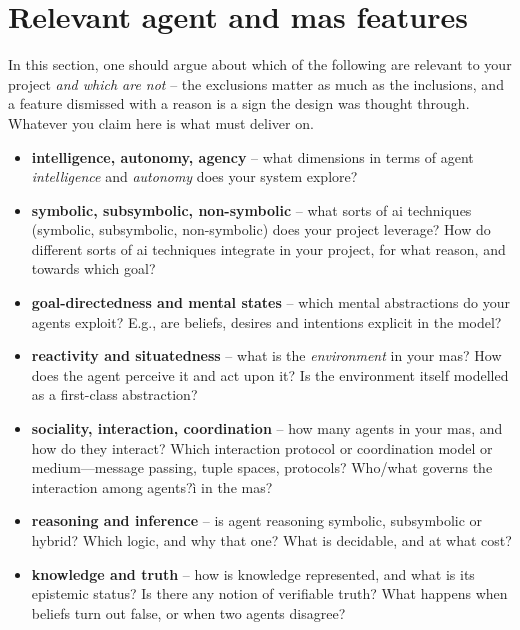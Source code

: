 \documentclass[11pt,a4paper]{scrartcl}
\begin{document}
\section{Relevant agent and \acs*{mas} features}
\label{sec:features}

\begin{guidance}
In this section, one should argue about which of the following are relevant to your project \emph{and which are not} – the exclusions matter as much as the inclusions, and a feature dismissed with a reason is a sign the design was thought through. Whatever you claim here is what  must deliver on.

\begin{itemize}
  \item \textbf{intelligence, autonomy, agency} – 
  what dimensions in terms of agent \emph{intelligence} and \emph{autonomy} does your system explore?

  \item \textbf{symbolic, subsymbolic, non-symbolic} – 
  what sorts of \ac{ai} techniques (symbolic, subsymbolic, non-symbolic) does your project leverage?
  How do different sorts of \ac{ai} techniques integrate in your project, for what reason, and towards which goal?

  \item \textbf{goal-directedness and mental states} – 
  which mental abstractions do your agents exploit? 
  E.g., are beliefs, desires and intentions explicit in the model?

  \item \textbf{reactivity and situatedness} – 
  what is the \emph{environment} in your \ac{mas}?
  How does the agent perceive it and act upon it? 
  Is the environment itself modelled as a first-class abstraction?

  \item \textbf{sociality, interaction, coordination} – how many agents in your \ac{mas}, and how do they interact? 
  Which interaction protocol or coordination model or medium—message passing, tuple spaces, protocols?
  Who/what governs the interaction among agents?ì in the \ac{mas}?

  \item \textbf{reasoning and inference} – is agent reasoning symbolic, subsymbolic or hybrid? 
  Which logic, and why that one? 
  What is decidable, and at what cost?

  \item \textbf{knowledge and truth} – how is knowledge represented, and what is its epistemic status? 
  Is there any notion of verifiable truth?
  What happens when beliefs turn out false, or when two agents disagree?


\end{itemize}
\end{guidance}
\end{document}
